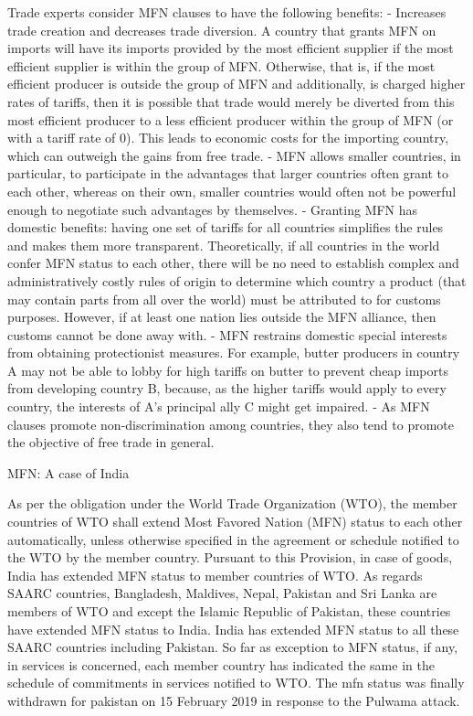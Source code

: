 \documentclass[
]{book}
\begin{document}
Trade experts consider MFN clauses to have the following benefits:
- Increases trade creation and decreases trade diversion. A country that grants MFN on imports will have its imports provided by the most efficient supplier if the most efficient supplier is within the group of MFN. Otherwise, that is, if the most efficient producer is outside the group of MFN and additionally, is charged higher rates of tariffs, then it is possible that trade would merely be diverted from this most efficient producer to a less efficient producer within the group of MFN (or with a tariff rate of 0). This leads to economic costs for the importing country, which can outweigh the gains from free trade.
- MFN allows smaller countries, in particular, to participate in the advantages that larger countries often grant to each other, whereas on their own, smaller countries would often not be powerful enough to negotiate such advantages by themselves.
- Granting MFN has domestic benefits: having one set of tariffs for all countries simplifies the rules and makes them more transparent. Theoretically, if all countries in the world confer MFN status to each other, there will be no need to establish complex and administratively costly rules of origin to determine which country a product (that may contain parts from all over the world) must be attributed to for customs purposes. However, if at least one nation lies outside the MFN alliance, then customs cannot be done away with.
- MFN restrains domestic special interests from obtaining protectionist measures. For example, butter producers in country A may not be able to lobby for high tariffs on butter to prevent cheap imports from developing country B, because, as the higher tariffs would apply to every country, the interests of A's principal ally C might get impaired.
- As MFN clauses promote non-discrimination among countries, they also tend to promote the objective of free trade in general.

MFN: A case of India

As per the obligation under the World Trade Organization (WTO), the member countries of WTO shall extend Most Favored Nation (MFN) status to each other automatically, unless otherwise specified in the agreement or schedule notified to the WTO by the member country. Pursuant to this Provision, in case of goods, India has extended MFN status to member countries of WTO. As regards SAARC countries, Bangladesh, Maldives, Nepal, Pakistan and Sri Lanka are members of WTO and except the Islamic Republic of Pakistan, these countries have extended MFN status to India. India has extended MFN status to all these SAARC countries including Pakistan. So far as exception to MFN status, if any, in services is concerned, each member country has indicated the same in the schedule of commitments in services notified to WTO. The mfn status was finally withdrawn for pakistan on 15 February 2019 in response to the Pulwama attack.
\end{document}
